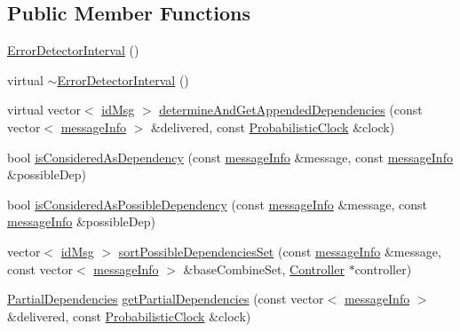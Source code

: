 \subsection*{Public Member Functions}
\begin{DoxyCompactItemize}
\item 
\hyperlink{class_error_detector_interval_a31b5edf31d0bfa45dfe4d0e4733d59b2}{Error\+Detector\+Interval} ()
\item 
virtual \hyperlink{class_error_detector_interval_a13501d384b2f53dd19dfa1dd9ee0f8fe}{$\sim$\+Error\+Detector\+Interval} ()
\item 
virtual vector$<$ \hyperlink{structures_8h_a83a1d9a070efa5341da84cfd8e28d3e5}{id\+Msg} $>$ \hyperlink{class_error_detector_interval_a6cb5dc28ef7349060d15727e92a6780a}{determine\+And\+Get\+Appended\+Dependencies} (const vector$<$ \hyperlink{structures_8h_a7e7bdc1d2fff8a9436f2f352b2711ed6}{message\+Info} $>$ \&delivered, const \hyperlink{class_probabilistic_clock}{Probabilistic\+Clock} \&clock)
\item 
bool \hyperlink{class_error_detector_interval_a27cb3ca9d7e5c3ddda9ee5ee66f182ed}{is\+Considered\+As\+Dependency} (const \hyperlink{structures_8h_a7e7bdc1d2fff8a9436f2f352b2711ed6}{message\+Info} \&message, const \hyperlink{structures_8h_a7e7bdc1d2fff8a9436f2f352b2711ed6}{message\+Info} \&possible\+Dep)
\item 
bool \hyperlink{class_error_detector_interval_a33bf470042fb65d833fd0f091374a046}{is\+Considered\+As\+Possible\+Dependency} (const \hyperlink{structures_8h_a7e7bdc1d2fff8a9436f2f352b2711ed6}{message\+Info} \&message, const \hyperlink{structures_8h_a7e7bdc1d2fff8a9436f2f352b2711ed6}{message\+Info} \&possible\+Dep)
\item 
vector$<$ \hyperlink{structures_8h_a83a1d9a070efa5341da84cfd8e28d3e5}{id\+Msg} $>$ \hyperlink{class_error_detector_interval_abe98fbb4f13aeb919d2c2e8755f003ae}{sort\+Possible\+Dependencies\+Set} (const \hyperlink{structures_8h_a7e7bdc1d2fff8a9436f2f352b2711ed6}{message\+Info} \&message, const vector$<$ \hyperlink{structures_8h_a7e7bdc1d2fff8a9436f2f352b2711ed6}{message\+Info} $>$ \&base\+Combine\+Set, \hyperlink{class_controller}{Controller} $\ast$controller)
\item 
\hyperlink{class_partial_dependencies}{Partial\+Dependencies} \hyperlink{class_error_detector_interval_a9494a918f551eb1efcab39ffd68316d6}{get\+Partial\+Dependencies} (const vector$<$ \hyperlink{structures_8h_a7e7bdc1d2fff8a9436f2f352b2711ed6}{message\+Info} $>$ \&delivered, const \hyperlink{class_probabilistic_clock}{Probabilistic\+Clock} \&clock)
\end{DoxyCompactItemize}
